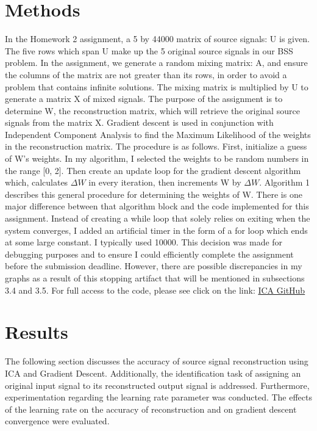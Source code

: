 \documentclass[12pt]{article}
\begin{document}
\section{Methods}

In the Homework 2 assignment, a 5 by 44000 matrix of source signals: U is given. The five rows which span U make up the 5 original source signals in our BSS problem. In the assignment, we generate a random mixing matrix: A, and ensure the columns of the matrix are not greater than its rows, in order to avoid a problem that contains infinite solutions. The mixing matrix is multiplied by U to generate a matrix X of mixed signals. The purpose of the assignment is to determine W, the reconstruction matrix, which will retrieve the original source signals from the matrix X. 
\bigbreak
\noindent
Gradient descent is used in conjunction with Independent Component Analysis to find the Maximum Likelihood of the weights in the reconstruction matrix. The procedure is as follows.
\bigbreak
\noindent
First, initialize a guess of W's weights. In my algorithm, I selected the weights to be random numbers in the range [0, 2]. Then create an update loop for the gradient descent algorithm which, calculates \(\Delta W\) in every iteration, then increments W by \(\Delta W\). Algorithm 1 describes this general procedure for determining the weights of W. There is one major difference between that algorithm block and the code implemented for this assignment. Instead of creating a while loop that solely relies on exiting when the system converges, I added an artificial timer in the form of a for loop which ends at some large constant. I typically used 10000. This decision was made for debugging purposes and to ensure I could efficiently complete the assignment before the  submission deadline. However, there are possible discrepancies in my graphs as a result of this stopping artifact that will be mentioned in subsections 3.4 and 3.5.
\bigbreak
\noindent
For full access to the code, please see click on the link:  \href{https://github.com/SouLeo/MachineLearning/tree/master/HW2_Independent_Component_Analysis}{ICA GitHub}

\section{Results}

The following section discusses the accuracy of source signal reconstruction using ICA and Gradient Descent. Additionally, the identification task of assigning an original input signal to its reconstructed output signal is addressed. Furthermore, experimentation regarding the learning rate parameter was conducted. The effects of the learning rate on the accuracy of reconstruction and on gradient descent convergence were evaluated. 
\end{document}
